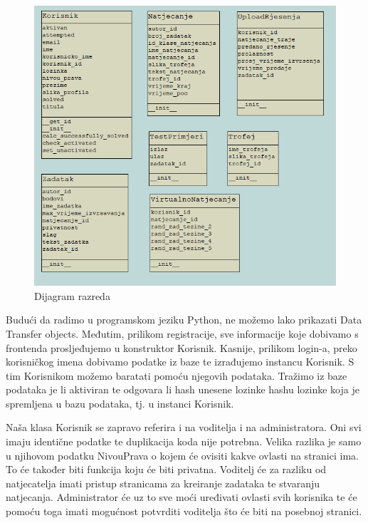 			\begin{figure}[H]
				\includegraphics[width=\textwidth]{slike/DijagramRazreda.png} %
				\caption{Dijagram razreda}
				\label{fig:DijagramRazreda} %
			\end{figure}	
			

			Budući da radimo u programskom jeziku Python, ne možemo lako prikazati Data Transfer objects.
			Međutim, prilikom registracije, sve informacije koje dobivamo s frontenda prosljeđujemo u konstruktor
			Korisnik. Kasnije, prilikom login-a, preko korisničkog imena dobivamo podatke iz baze te izrađujemo instancu Korisnik.
			S tim Korisnikom možemo baratati pomoću njegovih podataka. Tražimo iz baze podataka je li aktiviran te odgovara li
			hash unesene lozinke hashu lozinke koja je spremljena u bazu podataka, tj. u instanci Korisnik.

			Naša klasa Korisnik se zapravo referira i na voditelja i na administratora. Oni svi imaju identične podatke te duplikacija koda
			nije potrebna. Velika razlika je samo u njihovom podatku NivouPrava o kojem će ovisiti kakve ovlasti na stranici ima.
			To će također biti funkcija koju će biti privatna. Voditelj će za razliku od natjecatelja imati pristup stranicama
			za  kreiranje zadataka te stvaranju natjecanja. Administrator će uz to sve moći uređivati ovlasti svih korisnika te će pomoću toga imati mogućnost potvrditi voditelja što će biti na posebnoj stranici.



